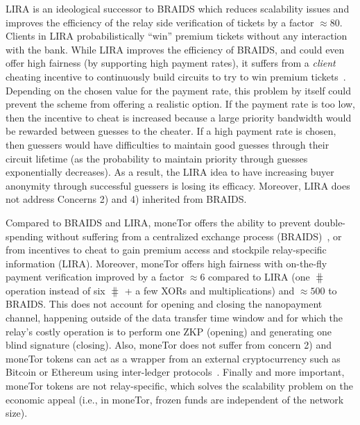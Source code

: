 LIRA is an ideological successor to BRAIDS which reduces scalability issues and
improves the efficiency of the relay side verification of tickets by a factor
$\approx 80$. Clients in LIRA probabilistically ``win'' premium tickets without
any interaction with the bank. While LIRA improves the efficiency of BRAIDS, and
could even offer high fairness (by supporting high payment rates), it suffers
from a \textit{client} cheating incentive to continuously build circuits to try
to win premium tickets~\cite{jansen2013lira, jansenblogpost}. Depending on the
chosen value for the payment rate, this problem by itself could prevent the
scheme from offering a realistic option. If the payment rate is too low, then
the incentive to cheat is increased because a large priority bandwidth would be
rewarded between guesses to the cheater. If a high payment rate is chosen, then
guessers would have difficulties to maintain good guesses through their circuit
lifetime (as the probability to maintain priority through guesses exponentially
decreases). As a result, the LIRA idea to have increasing buyer anonymity
through successful guessers is losing its efficacy. Moreover, LIRA does not
address Concerns 2) and 4) inherited from BRAIDS.

Compared to BRAIDS and LIRA, moneTor offers the ability to prevent
double-spending without suffering from a centralized exchange process
(BRAIDS)~\cite{jansenblogpost}, or from incentives to cheat to gain premium
access and stockpile relay-specific information (LIRA). Moreover, moneTor offers
high fairness with on-the-fly payment verification improved by a factor $\approx
6$ compared to LIRA (one $\hash$ operation instead of six $\hash$ + a few XORs
and multiplications) and $\approx 500$ to BRAIDS. This does not account for
opening and closing the nanopayment channel, happening outside of the data
transfer time window and for which the relay's costly operation is to perform
one ZKP (opening) and generating one blind signature (closing). Also, moneTor
does not suffer from concern 2) and moneTor tokens can act as a wrapper from an
external cryptocurrency such as Bitcoin or Ethereum using inter-ledger
protocols~\cite{back2014enabling, poon2017plasma}.
  Finally and more important, moneTor tokens are not relay-specific, which
  solves the scalability problem on the economic appeal (i.e., in moneTor,
  frozen funds are independent of the network size).

